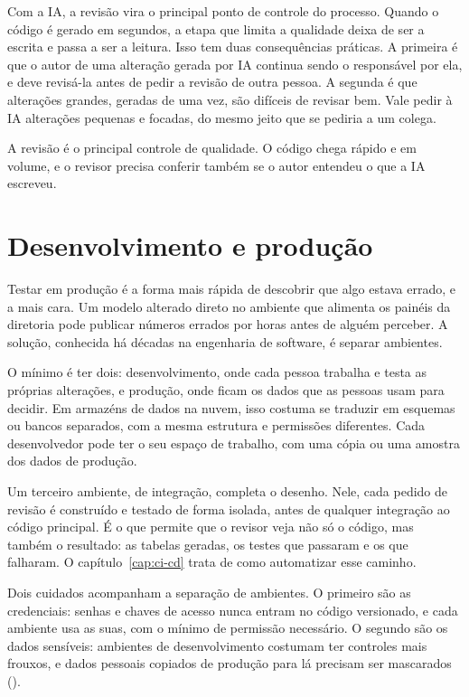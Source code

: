 Com a IA, a revisão vira o principal ponto de controle do processo. Quando o código é gerado
em segundos, a etapa que limita a qualidade deixa de ser a escrita e passa a ser a leitura.
Isso tem duas consequências práticas. A primeira é que o autor de uma alteração gerada por IA
continua sendo o responsável por ela, e deve revisá-la antes de pedir a revisão de outra
pessoa. A segunda é que alterações grandes, geradas de uma vez, são difíceis de revisar bem.
Vale pedir à IA alterações pequenas e focadas, do mesmo jeito que se pediria a um colega.

{A revisão é o principal controle de qualidade. O código chega rápido e em volume, e o revisor
precisa conferir também se o autor entendeu o que a IA escreveu.}

\section{Desenvolvimento e produção}
\label{sec:ambientes}

Testar em produção é a forma mais rápida de descobrir que algo estava errado, e a mais cara.
Um modelo alterado direto no ambiente que alimenta os painéis da diretoria pode publicar
números errados por horas antes de alguém perceber. A solução, conhecida há décadas na
engenharia de software, é separar ambientes.

O mínimo é ter dois: desenvolvimento, onde cada pessoa trabalha e testa as próprias
alterações, e produção, onde ficam os dados que as pessoas usam para decidir. Em armazéns de
dados na nuvem, isso costuma se traduzir em esquemas ou bancos separados, com a mesma
estrutura e permissões diferentes. Cada desenvolvedor pode ter o seu espaço de trabalho, com
uma cópia ou uma amostra dos dados de produção.

Um terceiro ambiente, de integração, completa o desenho. Nele, cada pedido de revisão é
construído e testado de forma isolada, antes de qualquer integração ao código principal. É o
que permite que o revisor veja não só o código, mas também o resultado: as tabelas geradas,
os testes que passaram e os que falharam. O capítulo~\ref{cap:ci-cd} trata de como
automatizar esse caminho.

Dois cuidados acompanham a separação de ambientes. O primeiro são as credenciais: senhas e
chaves de acesso nunca entram no código versionado, e cada ambiente usa as suas, com o
mínimo de permissão necessário. O segundo são os dados sensíveis: ambientes de
desenvolvimento costumam ter controles mais frouxos, e dados pessoais copiados de produção
para lá precisam ser mascarados ().

